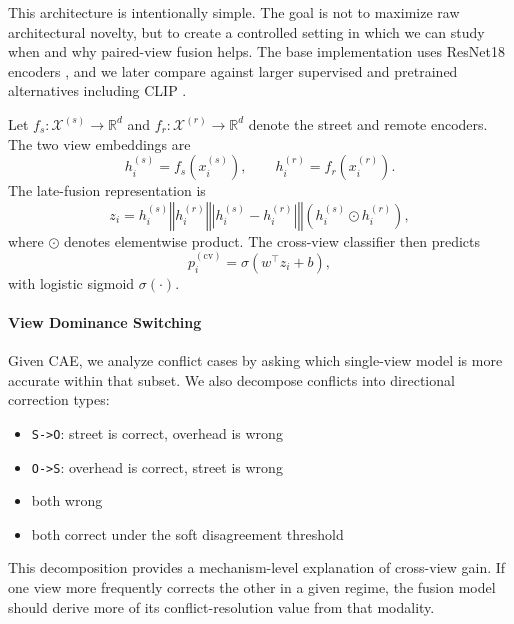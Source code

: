 \documentclass[sigconf]{acmart}
\newcommand{\R}{\mathbb{R}}
\newcommand{\concat}{\mathbin\Vert}
\begin{document}
This architecture is intentionally simple. The goal is not to maximize raw
architectural novelty, but to create a controlled setting in which we can study
when and why paired-view fusion helps. The base implementation uses ResNet18
encoders \cite{he2016deep}, and we later compare against larger supervised
and pretrained alternatives including CLIP \cite{radford2021learning}.

Let $f_s:\mathcal{X}^{(s)}\to\R^d$ and $f_r:\mathcal{X}^{(r)}\to\R^d$ denote
the street and remote encoders. The two view embeddings are
\begin{equation}
h_i^{(s)} = f_s(x_i^{(s)}), \qquad h_i^{(r)} = f_r(x_i^{(r)}).
\end{equation}
The late-fusion representation is
\begin{equation}
z_i=
h_i^{(s)} \concat
h_i^{(r)} \concat
\left|h_i^{(s)}-h_i^{(r)}\right| \concat
\left(h_i^{(s)}\odot h_i^{(r)}\right),
\label{eq:fusionrepr}
\end{equation}
where $\odot$ denotes elementwise product. The cross-view classifier then
predicts
\begin{equation}
p_i^{(\mathrm{cv})}=\sigma(w^\top z_i+b),
\label{eq:cvprob}
\end{equation}
with logistic sigmoid $\sigma(\cdot)$.

\paragraph{View Dominance Switching}

Given CAE, we analyze conflict cases by asking which single-view model is more
accurate within that subset. We also decompose conflicts into directional
correction types:
\begin{itemize}
  \item \texttt{S->O}: street is correct, overhead is wrong
  \item \texttt{O->S}: overhead is correct, street is wrong
  \item both wrong
  \item both correct under the soft disagreement threshold
\end{itemize}

This decomposition provides a mechanism-level explanation of cross-view gain.
If one view more frequently corrects the other in a given regime, the fusion
model should derive more of its conflict-resolution value from that modality.
\end{document}
